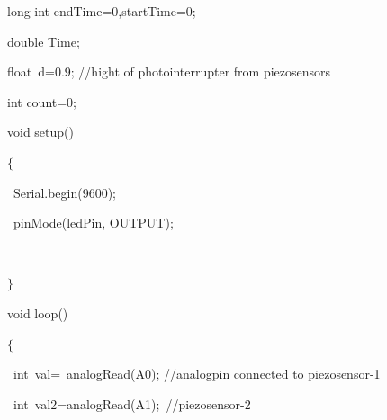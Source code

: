 \documentclass[12pt]{article}
\begin{document}
{\fontsize{14pt}{16.8pt}\selectfont long int endTime=0,startTime=0;\par}\par

{\fontsize{14pt}{16.8pt}\selectfont double Time;\par}\par

{\fontsize{14pt}{16.8pt}\selectfont float\ d=0.9;  //hight of photointerrupter from piezosensors\par}\par

{\fontsize{14pt}{16.8pt}\selectfont int count=0;\par}\par


\vspace{\baselineskip}
{\fontsize{14pt}{16.8pt}\selectfont void setup()\par}\par

{\fontsize{14pt}{16.8pt}\selectfont $ \{ $ \par}\par

{\fontsize{14pt}{16.8pt}\selectfont \  Serial.begin(9600);\par}\par

{\fontsize{14pt}{16.8pt}\selectfont \  pinMode(ledPin, OUTPUT);\par}\par

{\fontsize{14pt}{16.8pt}\selectfont \  \par}\par

{\fontsize{14pt}{16.8pt}\selectfont $ \} $ \par}\par


\vspace{\baselineskip}
{\fontsize{14pt}{16.8pt}\selectfont void loop()\par}\par

{\fontsize{14pt}{16.8pt}\selectfont $ \{ $ \par}\par

{\fontsize{14pt}{16.8pt}\selectfont \  int\ val=\ analogRead(A0);   //analogpin connected to piezosensor-1\par}\par

{\fontsize{14pt}{16.8pt}\selectfont \  int\ val2=analogRead(A1);\   //piezosensor-2\par}\par
\end{document}
